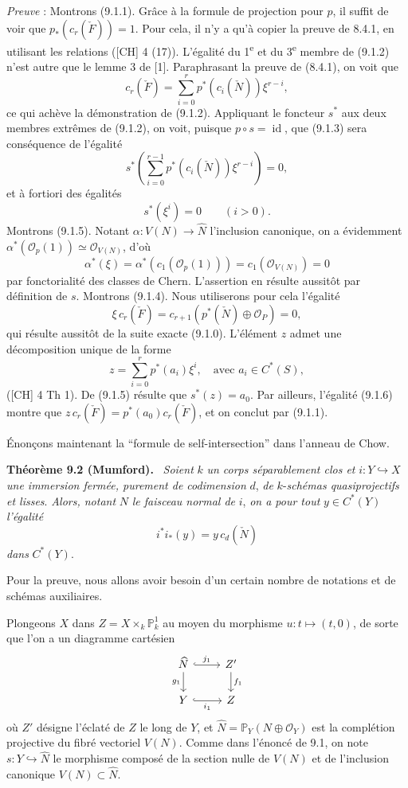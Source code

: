 \documentclass[11pt]{article}
\newenvironment{statement}[1]{\par\medskip\noindent\textbf{#1.}\ }{\par\medskip}
\begin{document}
\emph{Preuve} : Montrons (9.1.1). Grâce à la formule de projection pour $p$, il suffit de voir que $p_*(c_r(\check F))=1$. Pour cela, il n'y a qu'à copier la preuve de 8.4.1, en utilisant les relations ([CH] 4 (17)). L'égalité du 1\textsuperscript{e} et du 3\textsuperscript{e} membre de (9.1.2) n'est autre que le lemme 3 de [1]. Paraphrasant la preuve de (8.4.1), on voit que
\[
c_r(\check F)=\sum_{i=0}^r p^*(c_i(\check N))\xi^{r-i},
\tag*{(9.1.2) bis}
\]
ce qui achève la démonstration de (9.1.2). Appliquant le foncteur $s^*$ aux deux membres extrêmes de (9.1.2), on voit, puisque $p\circ s=\operatorname{id}$, que (9.1.3) sera conséquence de l'égalité
\[
s^*\left(\sum_{i=0}^{r-1}p^*(c_i(\check N))\xi^{r-i}\right)=0,
\]
et à fortiori des égalités
\[
s^*(\xi^i)=0\qquad(i>0).
\tag{9.1.5}
\]
Montrons (9.1.5). Notant $\alpha:V(N)\to\widehat N$ l'inclusion canonique, on a évidemment $\alpha^*(\mathcal O_p(1))\simeq\mathcal O_{V(N)}$, d'où
\[
\alpha^*(\xi)=\alpha^*(c_1(\mathcal O_p(1)))=c_1(\mathcal O_{V(N)})=0
\]
par fonctorialité des classes de Chern. L'assertion en résulte aussitôt par définition de $s$. Montrons (9.1.4). Nous utiliserons pour cela l'égalité
\[
\xi\,c_r(\check F)=c_{r+1}(p^*(\check N)\oplus\mathcal O_P)=0,
\tag{9.1.6}
\]
qui résulte aussitôt de la suite exacte (9.1.0). L'élément $z$ admet une décomposition unique de la forme
\[
z=\sum_{i=0}^r p^*(a_i)\xi^i,\quad\text{avec }a_i\in C^*(S),
\]
([CH] 4 Th 1). De (9.1.5) résulte que $s^*(z)=a_0$. Par ailleurs, l'égalité (9.1.6) montre que $z\,c_r(\check F)=p^*(a_0)c_r(\check F)$, et on conclut par (9.1.1).

Énonçons maintenant la ``formule de self-intersection'' dans l'anneau de Chow.

\begin{statement}{Théorème 9.2 (Mumford)}
\emph{Soient} $k$ \emph{un corps séparablement clos et} $i:Y\hookrightarrow X$ \emph{une immersion fermée, purement de codimension} $d$, \emph{de} $k$-\emph{schémas quasiprojectifs et lisses}. \emph{Alors, notant} $N$ \emph{le faisceau normal de} $i$, \emph{on a pour tout} $y\in C^*(Y)$ \emph{l'égalité}
\[
i^*i_*(y)=y\,c_d(\check N)
\]
\emph{dans} $C^*(Y)$.
\end{statement}

Pour la preuve, nous allons avoir besoin d'un certain nombre de notations et de schémas auxiliaires.

Plongeons $X$ dans $Z=X\times_k\mathbb P^1_k$ au moyen du morphisme $u:t\mapsto(t,0)$, de sorte que l'on a un diagramme cartésien
\[
\begin{tikzcd}
\widehat N \arrow[r,hook,"j_1"] \arrow[d,"g_1"'] & Z' \arrow[d,"f_1"]\\
Y \arrow[r,hook,"i_1"'] & Z
\end{tikzcd}
\]
où $Z'$ désigne l'éclaté de $Z$ le long de $Y$, et $\widehat N=\mathbb P_Y(N\oplus\mathcal O_Y)$ est la complétion projective du fibré vectoriel $V(N)$. Comme dans l'énoncé de 9.1, on note $s:Y\hookrightarrow\widehat N$ le morphisme composé de la section nulle de $V(N)$ et de l'inclusion canonique $V(N)\subset\widehat N$.
\end{document}
